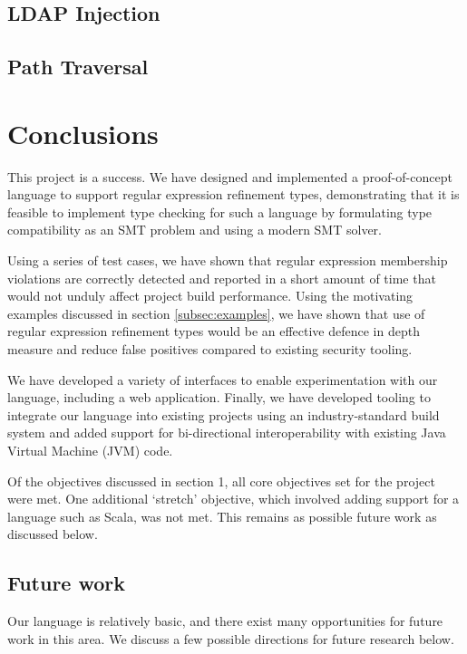 \documentclass[a4paper,openany,12pt]{book}
\begin{document}
\section{LDAP Injection}



\section{Path Traversal}


\chapter{Conclusions}

This project is a success.
We have designed and implemented a proof-of-concept language to support regular expression refinement types,
demonstrating that it is feasible to implement type checking for such a language by formulating type compatibility
as an SMT problem and using a modern SMT solver.

Using a series of test cases, we have shown that regular expression membership violations are correctly detected
and reported in a short amount of time that would not unduly affect project build performance.
Using the motivating examples discussed in section \ref{subsec:examples}, we have shown that use of regular expression
refinement types would be an effective defence in depth measure and reduce false positives compared to existing security
tooling.

We have developed a variety of interfaces to enable experimentation with our language, including a web application.
Finally, we have developed tooling to integrate our language into existing projects using an industry-standard build
system and added support for bi-directional interoperability with existing Java Virtual Machine (JVM) code.

Of the objectives discussed in section 1, all core objectives set for the project were met.
One additional `stretch' objective, which involved adding support for a language such as Scala, was not met.
This remains as possible future work as discussed below.

\section{Future work}
Our language is relatively basic, and there exist many opportunities for future work in this area.
We discuss a few possible directions for future research below.
\end{document}
